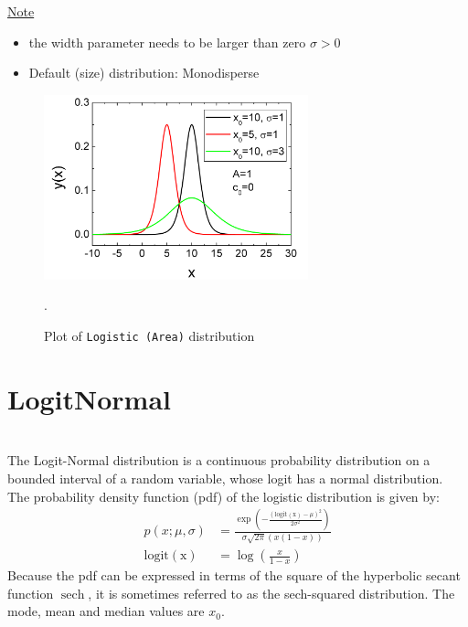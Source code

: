 \underline{Note}
\begin{itemize}
  \item the width parameter needs to be larger than zero $\sigma > 0$
  \item Default (size) distribution: Monodisperse
\end{itemize}

\begin{figure}[htb]
\begin{center}
\includegraphics[width=0.6824\textwidth]{LogisticArea.png}
\end{center}
\caption{Plot of \texttt{Logistic (Area)} distribution}.
\label{fig:LogisticArea}
\end{figure}

\clearpage
















\section{LogitNormal} ~\\
\label{sec:Logit}
The Logit-Normal distribution is a continuous
probability distribution on a bounded interval of a random variable, whose logit has a normal distribution.  The probability
density function (pdf) of the logistic  distribution is given by:
\begin{align}
p(x; \mu,\sigma) &= \frac{\exp\left(-\frac{\left(\operatorname{logit(x)}-\mu\right)^2}{2\sigma^2}\right)} {\sigma\sqrt{2\pi}\left(x(1-x)\right)} \\
\operatorname{logit(x)} &= \log\left(\frac{x}{1-x}\right)
\end{align}
Because the pdf can be expressed in terms of the square of the
hyperbolic secant function $\operatorname{sech}$, it is sometimes referred to as
the sech-squared distribution. The mode, mean and median values are $x_0$.
\vspace{1cm}
